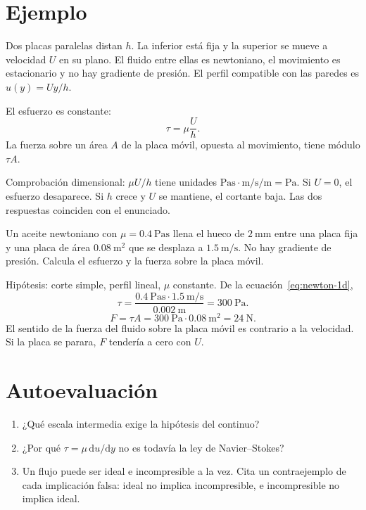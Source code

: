 \section{Ejemplo}
\begin{examplebox}
Dos placas paralelas distan \(h\). La inferior está fija y la superior se mueve a velocidad \(U\) en su plano. El fluido entre ellas es newtoniano, el movimiento es estacionario y no hay gradiente de presión. El perfil compatible con las paredes es \(u(y)=Uy/h\).

El esfuerzo es constante:
\[
\tau=\mu\frac{U}{h}.
\]
La fuerza sobre un área \(A\) de la placa móvil, opuesta al movimiento, tiene módulo \(\tau A\).

Comprobación dimensional: \(\mu U/h\) tiene unidades
\(\si{\pascal\second}\cdot\si{\metre\per\second}/\si{\metre}=\si{\pascal}\).
Si \(U=0\), el esfuerzo desaparece. Si \(h\) crece y \(U\) se mantiene, el cortante baja. Las dos respuestas coinciden con el enunciado.
\end{examplebox}

\begin{problembox}[Básico]
Un aceite newtoniano con \(\mu=\qty{0.4}{\pascal\second}\) llena el hueco de \(\qty{2}{\milli\metre}\) entre una placa fija y una placa de área \(\qty{0.08}{\square\metre}\) que se desplaza a \(\qty{1.5}{\metre\per\second}\). No hay gradiente de presión. Calcula el esfuerzo y la fuerza sobre la placa móvil.
\end{problembox}
\begin{solutionbox}
Hipótesis: corte simple, perfil lineal, \(\mu\) constante. De la ecuación~\eqref{eq:newton-1d},
\[
\tau=\frac{\qty{0.4}{\pascal\second}\cdot\qty{1.5}{\metre\per\second}}{\qty{0.002}{\metre}}=\qty{300}{\pascal}.
\]
\[
F=\tau A=\qty{300}{\pascal}\cdot\qty{0.08}{\square\metre}=\qty{24}{\newton}.
\]
El sentido de la fuerza del fluido sobre la placa móvil es contrario a la velocidad. Si la placa se parara, \(F\) tendería a cero con \(U\).
\end{solutionbox}

\section{Autoevaluación}
\begin{enumerate}[leftmargin=1.4em]
\item ¿Qué escala intermedia exige la hipótesis del continuo?
\item ¿Por qué \(\tau=\mu\,\mathrm{d}u/\mathrm{d}y\) no es todavía la ley de Navier--Stokes?
\item Un flujo puede ser ideal e incompresible a la vez. Cita un contraejemplo de cada implicación falsa: ideal no implica incompresible, e incompresible no implica ideal.
\end{enumerate}
